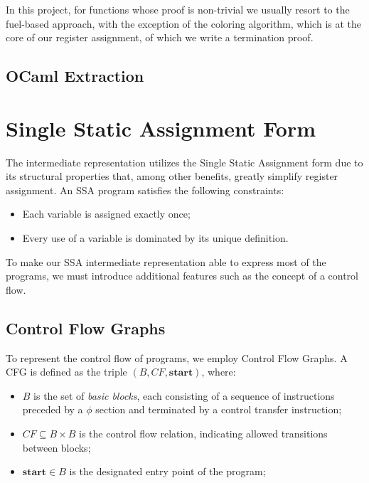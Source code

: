In this project, for functions whose proof is non-trivial we usually resort to the fuel-based approach, with the exception of the coloring algorithm, which is at the core of our register assignment, of which we write a termination proof.

\subsection{OCaml Extraction}

\section{Single Static Assignment Form}
\label{sec:ssa}

The intermediate representation utilizes the Single Static Assignment form due to its structural properties that, among other benefits, greatly simplify register assignment. An SSA program satisfies the following constraints:

\begin{itemize}
    \item Each variable is assigned exactly once;
    \item Every use of a variable is dominated by its unique definition.
\end{itemize}

To make our SSA intermediate representation able to express most of the programs, we must introduce additional features such as the concept of a control flow.

\subsection{Control Flow Graphs}
\label{subsec:cfg}

To represent the control flow of programs, we employ Control Flow Graphs. A CFG is defined as the triple $(B, CF, \textbf{start})$, where:

\begin{itemize}
    \item $B$ is the set of \textit{basic blocks}, each consisting of a sequence of instructions preceded by a $\phi$ section and terminated by a control transfer instruction;
    \item $CF \subseteq B \times B$ is the control flow relation, indicating allowed transitions between blocks;
    \item $\textbf{start} \in B$ is the designated entry point of the program;
\end{itemize}

